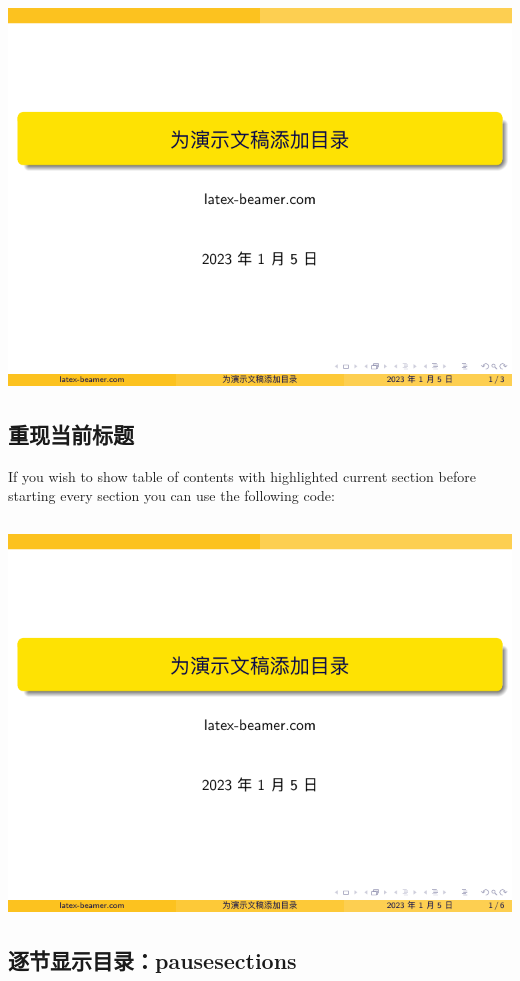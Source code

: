 \includegraphics[page=2]{examples/beamer/beamertoc02.pdf}

\subsection{重现当前标题}

If you wish to show table of contents with highlighted current section before starting every section you can use the following code:

\inputminted[linenos=true]{latex}{examples/beamer/beamertoc03.tex}

\includegraphics[page=3]{examples/beamer/beamertoc03.pdf}

\subsection{逐节显示目录：{\ttfamily pausesections}}

